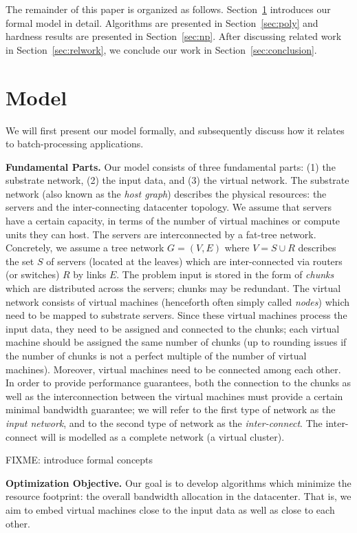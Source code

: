 \documentclass[9pt,twocolumn]{scrartcl}
\begin{document}
The remainder of this paper is organized as follows. 
Section~\ref{sec:model} introduces our formal model in detail.
Algorithms are presented in Section~\ref{sec:poly} and
hardness results are presented in Section~\ref{sec:np}.
After discussing related work in Section~\ref{sec:relwork},
we conclude our work in Section~\ref{sec:conclusion}.


\section{Model}\label{sec:model}

We will first present our model formally, and subsequently discuss how it relates
to batch-processing applications. 

\textbf{Fundamental Parts.} Our model consists of three fundamental parts: (1) the substrate network,
(2) the input data, and 
(3) the virtual network. 
The substrate network (also known as the \emph{host graph}) describes the physical resources: the servers 
and the inter-connecting datacenter topology. 
We assume that servers have a certain capacity, in terms of the number of virtual machines or compute units they
can host. The servers are interconnected by a fat-tree network. Concretely, we assume a tree network
$G=(V,E)$ where $V=S \cup R$ describes the set $S$ of servers (located at the leaves) which are inter-connected
via routers (or switches) $R$ by links $E$.
The problem input is stored in the form of \emph{chunks} which are distributed across the servers;
chunks may be redundant.
The virtual network consists of virtual machines (henceforth often simply called \emph{nodes}) which need to be mapped to substrate servers.
Since these virtual machines process the input data, they need to be assigned and connected to the
chunks; each virtual machine should be assigned the same number of chunks (up to rounding issues if
the number of chunks is not a perfect multiple of the number of virtual machines). Moreover, virtual machines need to be connected among each other.
In order to provide performance guarantees, both the connection to the chunks
as well as the interconnection between the virtual machines must provide a certain
minimal bandwidth guarantee; we will refer to the first type of network as the \emph{input 
network}, and to the second type of network as the \emph{inter-connect}. The inter-connect will
is modelled as a complete network (a virtual cluster).

FIXME: introduce formal concepts

\textbf{Optimization Objective.} Our goal is to develop algorithms which minimize
the resource footprint: the overall bandwidth allocation in the datacenter. That is,
we aim to embed virtual machines close to the input data as well as close to
each other.
\end{document}
